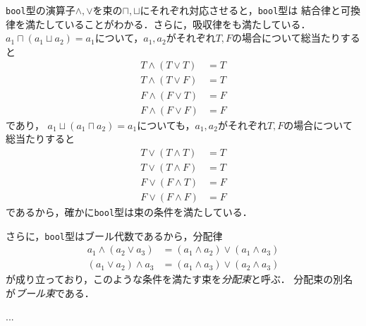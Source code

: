 \documentclass{jsbook}
\newcommand{\ccode}[1]{\texttt{#1}}
\newcommand{\keyword}[1]{\emph{#1}}
\begin{document}
\ccode{bool}型の演算子$\wedge,\vee$を束の$\sqcap,\sqcup$にそれぞれ対応させると，\ccode{bool}型は
結合律と可換律を満たしていることがわかる．さらに，吸収律をも満たしている．
$a_1\sqcap(a_1\sqcup a_2)=a_1$について，$a_1,a_2$がそれぞれ$T,F$の場合について総当たりすると
\begin{align}
T\wedge(T\vee T)&=T\\
T\wedge(T\vee F)&=T\\
F\wedge(F\vee T)&=F\\
F\wedge(F\vee F)&=F
\end{align}
であり，
$a_1\sqcup(a_1\sqcap a_2)=a_1$についても，$a_1,a_2$がそれぞれ$T,F$の場合について総当たりすると
\begin{align}
T\vee(T\wedge T)&=T\\
T\vee(T\wedge F)&=T\\
F\vee(F\wedge T)&=F\\
F\vee(F\wedge F)&=F
\end{align}
であるから，確かに\ccode{bool}型は束の条件を満たしている．

さらに，\ccode{bool}型はブール代数であるから，分配律
\begin{align}
a_1\wedge(a_2\vee a_3)&=(a_1\wedge a_2)\vee(a_1\wedge a_3)\\
(a_1\vee a_2)\wedge a_3&=(a_1\wedge a_3)\vee(a_2\wedge a_3)
\end{align}
が成り立っており，このような条件を満たす束を\keyword{分配束}と呼ぶ．
分配束の別名が\keyword{ブール束}である．

...
\end{document}
